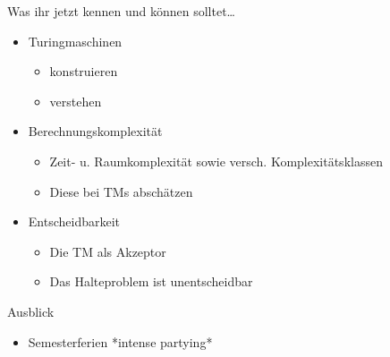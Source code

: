 	\begin{frame}{Was ihr jetzt kennen und können solltet\dots}
			\begin{itemize}
				\item Turingmaschinen
				\begin{itemize}
					\item konstruieren
					\item verstehen
				\end{itemize}
				\item Berechnungskomplexität
				\begin{itemize}
					\item Zeit- u. Raumkomplexität sowie versch. Komplexitätsklassen
					\item Diese bei TMs abschätzen
				\end{itemize}
				\item Entscheidbarkeit
				\begin{itemize}
					\item Die TM als Akzeptor
					\item Das Halteproblem ist unentscheidbar
				\end{itemize}
			\end{itemize}
	
	\end{frame}
	\begin{frame}{Ausblick}
		\begin{itemize}
			\item Semesterferien *intense partying*
		\end{itemize}
	\end{frame}
\section{}
\questionframe
{}
